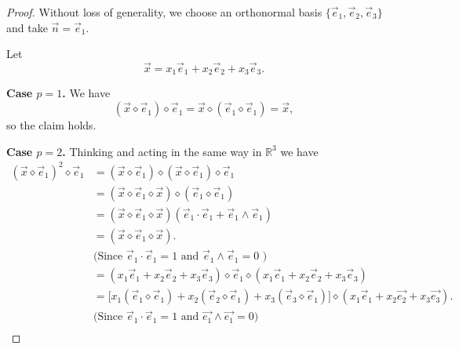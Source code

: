 \documentclass{amsart}
\theoremstyle{plain}
\numberwithin{equation}{section}
\begin{document}
\begin{proof}
Without loss of generality, we choose an orthonormal basis
$\{\vec e_1,\vec e_2,\vec e_3\}$ and take $\vec n=\vec e_1$.

Let
\[
\vec x = x_1\vec e_1 + x_2\vec e_2 + x_3\vec e_3.
\]

\textbf{Case $p=1$.}
We have
\[
(\vec x\diamond \vec e_1)\diamond \vec e_1
=
\vec x\diamond (\vec e_1\diamond \vec e_1)
=
\vec x,
\]
so the claim holds.

\medskip

\textbf{Case $p=2$.}
Thinking and acting in the same way in $\mathbb{R}^{3}$ we have
\begin{align*}
\left( \vec{x} \diamond \vec{e}_{1} \right)^{2} \diamond \vec{e}_{1}
&= \left( \vec{x} \diamond \vec{e}_{1} \right) \diamond 
   \left( \vec{x} \diamond \vec{e}_{1} \right) \diamond \vec{e}_{1} \\[4pt]
&= \left( \vec{x} \diamond \vec{e}_{1} \diamond \vec{x} \right)
   \diamond \left( \vec{e}_{1} \diamond \vec{e}_{1} \right) \\[4pt]
&= \left( \vec{x} \diamond \vec{e}_{1} \diamond \vec{x} \right)
   \left( \vec{e}_{1} \cdot \vec{e}_{1} + \vec{e}_{1} \wedge \vec{e}_{1} \right) \\[4pt]
&= \left( \vec{x} \diamond \vec{e}_{1} \diamond \vec{x} \right) .\\
& \text{(Since $\vec{e}_{1} \cdot \vec{e}_{1} = 1$ and $\vec{e}_{1} \wedge \vec{e}_{1} = 0$ )}\\[4pt]
&= \left( 
x_{1}\vec{e}_{1} + x_{2}\vec{e}_{2} + x_{3}\vec{e}_{3}
\right)
\diamond \vec{e}_{1}
\diamond 
\left(
x_{1}\vec{e}_{1} + x_{2}\vec{e}_{2} + x_{3}\vec{e}_{3}
\right) \\[6pt]
&= \Big[
x_{1}\left( \vec{e}_{1} \diamond \vec{e}_{1} \right)
+ x_{2}\left( \vec{e}_{2} \diamond \vec{e}_{1} \right)
+ x_{3}\left( \vec{e}_{3} \diamond \vec{e}_{1} \right)
\Big] \diamond
\left(
x_{1}\vec{e}_{1} + x_{2}\vec{e_2} + x_{3}\vec{e_3}
\right).\\[4pt]
& \text{(Since $\vec{e}_{1} \cdot \vec{e}_{1} = 1$ and $\vec{e_1} \wedge \vec{e_1} = 0$)}\\[4pt]

\end{align*}
\end{proof}
\end{document}
